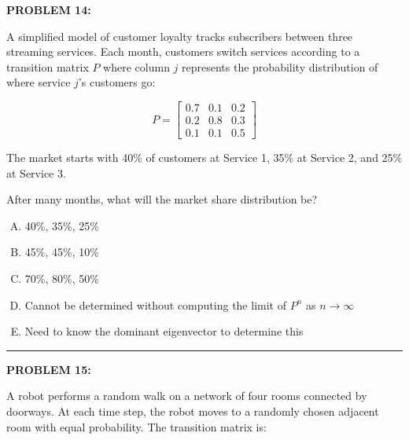 \documentclass[12pt]{amsart}
\newcommand{\divider}{
  \vspace{-1em} %
  \noindent
  \raisebox{-0.15ex}{\textbullet}%
  \hspace{0.5em}%
  \rule[0.5ex]{0.95\textwidth}{1.0pt}%
  \hspace{0.5em}%
  \raisebox{-0.15ex}{\textbullet}%
  \vspace{0em} %
}
\begin{document}
{\bf PROBLEM 14:}

A simplified model of customer loyalty tracks subscribers between three streaming services. Each month, customers switch services according to a transition matrix $P$ where column $j$ represents the probability distribution of where service $j$'s customers go:

$$P = \begin{bmatrix} 0.7 & 0.1 & 0.2 \\ 0.2 & 0.8 & 0.3 \\ 0.1 & 0.1 & 0.5 \end{bmatrix}$$

The market starts with 40\% of customers at Service 1, 35\% at Service 2, and 25\% at Service 3.

After many months, what will the market share distribution be?

\begin{enumerate}[(A)]
\item 40\%, 35\%, 25\% 
\item 45\%, 45\%, 10\% 
\item 70\%, 80\%, 50\% 
\item Cannot be determined without computing the limit of $P^n$ as $n\to\infty$
\item Need to know the dominant eigenvector to determine this
\end{enumerate}


\divider
\newpage

{\bf PROBLEM 15:}

A robot performs a random walk on a network of four rooms connected by doorways. At each time step, the robot moves to a randomly chosen adjacent room with equal probability. The transition matrix is:
\end{document}
